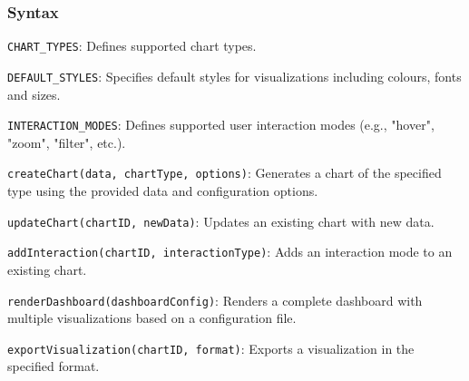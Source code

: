 \documentclass[12pt, titlepage]{article}
\begin{document}
\subsubsection{Syntax}
\begin{description}
  \item[Exported Constants:] 
  \item \texttt{CHART\_TYPES}: Defines supported chart types.
  \item \texttt{DEFAULT\_STYLES}: Specifies default styles for visualizations including colours, 
  fonts and sizes.
  \item \texttt{INTERACTION\_MODES}: Defines supported user interaction modes (e.g., "hover", "zoom",
  "filter", etc.).
  \item 
  \item[Exported Access Programs:] 
  \item \texttt{createChart(data, chartType, options)}: Generates a chart of the specified type using 
  the provided data and configuration options.
  \item \texttt{updateChart(chartID, newData)}: Updates an existing chart with new data.
  \item \texttt{addInteraction(chartID, interactionType)}: Adds an interaction mode to an existing chart.
  \item \texttt{renderDashboard(dashboardConfig)}: Renders a complete dashboard with multiple visualizations 
  based on a configuration file.
  \item \texttt{exportVisualization(chartID, format)}: Exports a visualization in the specified format.
  \item
\end{description}
\end{document}
